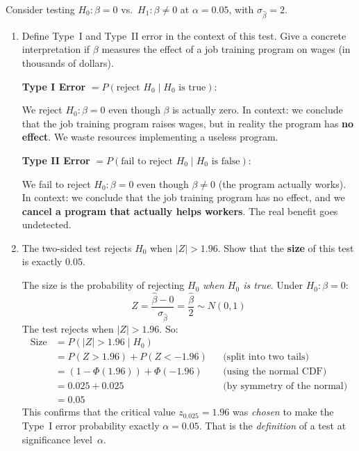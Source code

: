 \documentclass[11pt,a4paper]{article}
\begin{document}
\medskip
Consider testing $H_0\colon \beta = 0$ vs.\ $H_1\colon \beta \ne 0$ at $\alpha = 0.05$, with $\sigma_{\hat{\beta}} = 2$.

\begin{enumerate}[label=(\alph*)]
\item Define Type~I and Type~II error in the context of this test. Give a concrete interpretation if $\beta$ measures the effect of a job training program on wages (in thousands of dollars).

\begin{solution}
\textbf{Type I Error} $= P(\text{reject } H_0 \mid H_0 \text{ is true})$:

We reject $H_0\colon \beta = 0$ even though $\beta$ is actually zero. In context: we conclude that the job training program raises wages, but in reality the program has \textbf{no effect}. We waste resources implementing a useless program.

\medskip

\textbf{Type II Error} $= P(\text{fail to reject } H_0 \mid H_0 \text{ is false})$:

We fail to reject $H_0\colon \beta = 0$ even though $\beta \ne 0$ (the program actually works). In context: we conclude that the job training program has no effect, and we \textbf{cancel a program that actually helps workers}. The real benefit goes undetected.
\end{solution}

\item The two-sided test rejects $H_0$ when $|Z| > 1.96$. Show that the \textbf{size} of this test is exactly $0.05$.

\begin{solution}
The size is the probability of rejecting $H_0$ \emph{when $H_0$ is true}. Under $H_0\colon \beta = 0$:
\[
  Z = \frac{\hat{\beta} - 0}{\sigma_{\hat{\beta}}} = \frac{\hat{\beta}}{2} \sim N(0, 1)
\]
The test rejects when $|Z| > 1.96$. So:
\begin{align*}
  \text{Size}
  &= P(|Z| > 1.96 \mid H_0)  \\
  &= P(Z > 1.96) + P(Z < -1.96) & &\text{(split into two tails)}\\
  &= (1 - \Phi(1.96)) + \Phi(-1.96) & &\text{(using the normal CDF)} \\
  &= 0.025 + 0.025  & &\text{(by symmetry of the normal)} \\
  &= \boxed{0.05}
\end{align*}
This confirms that the critical value $z_{0.025} = 1.96$ was \emph{chosen} to make the Type~I error probability exactly $\alpha = 0.05$. That is the \emph{definition} of a test at significance level~$\alpha$.
\end{solution}


\end{enumerate}
\end{document}
